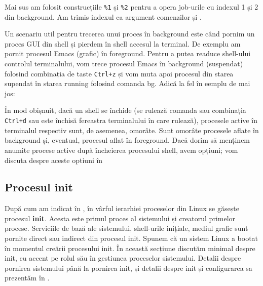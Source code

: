 Mai sus am folosit construcțiile \texttt{\%1} și \texttt{\%2} pentru a opera job-urile cu indexul 1 și 2 din background. Am trimis indexul ca argument comenzilor  și .

Un scenariu util pentru trecerea unui proces în background este când pornim un
proces GUI  din shell și pierdem în shell
accesul la terminal. De exemplu am pornit procesul Emacs (grafic) în foreground.
Pentru a putea readuce shell-ului controlul terminalului, vom trece procesul
Emacs în background (suspendat) folosind combinația de taste \texttt{Ctrl+z} și vom muta
apoi procesul din starea supendat în starea running folosind comanda bg. Adică
la fel în eemplu de mai jos:


În mod obișnuit, dacă un shell se închide (se rulează comanda  sau
combinația \texttt{Ctrl+d} sau este închisă fereastra terminalului în care rulează),
procesele active în terminalul respectiv sunt, de asemenea, omorâte. Sunt
omorâte procesele aflate în background și, eventual, procesul aflat în
foreground. Dacă dorim să menținem anumite procese active după încheierea
procesului shell, avem opțiuni; vom discuta despre aceste optiuni în

\subsection{Procesul init}
\label{sec:procese-ierarhie-init}

După cum am indicat în ,
în vârful ierarhiei proceselor din Linux se găsește procesul \textbf{init}. Acesta este
primul proces al sistemului și creatorul primelor procese. Serviciile de bază
ale sistemului, shell-urile inițiale, mediul grafic sunt pornite direct sau
indirect din procesul init. Spunem că un sistem Linux a bootat în momentul
creării procesului init. În această secțiune discutăm minimal despre init, cu
accent pe rolul său în gestiunea proceselor sistemului. Detalii despre pornirea
sistemului până la pornirea init, și detalii despre init și configurarea sa
prezentăm în .


